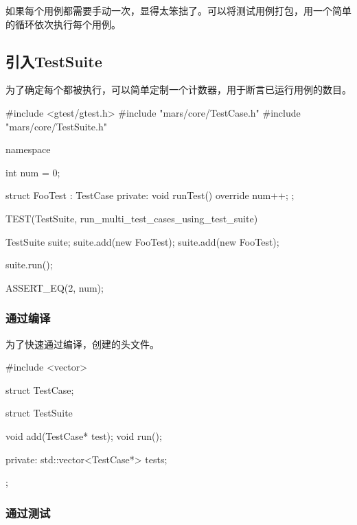 \begin{content}

如果每个用例都需要手动一次，显得太笨拙了。可以将测试用例打包，用一个简单的循环依次执行每个用例。

\subsection{引入TestSuite}

为了确定每个都被执行，可以简单定制一个计数器，用于断言已运行用例的数目。

\begin{leftbar}
 \begin{c++}[caption={\ttfamily{test/mars/core/TestSuiteSpec.cc}}]
#include <gtest/gtest.h>
#include "mars/core/TestCase.h"
#include "mars/core/TestSuite.h"

namespace {
  int num = 0;

  struct FooTest : TestCase {
  private:
    void runTest() override {
      num++;
    }
  };
}

TEST(TestSuite, run_multi_test_cases_using_test_suite) {
  TestSuite suite;
  suite.add(new FooTest);
  suite.add(new FooTest);

  suite.run();

  ASSERT_EQ(2, num);
}
 \end{c++}
\end{leftbar}

\subsubsection{通过编译}

为了快速通过编译，创建的头文件。

\begin{leftbar}
 \begin{c++}[caption={\ttfamily{include/mars/core/TestSuite.h}}]
#include <vector>

struct TestCase;

struct TestSuite {
  void add(TestCase* test);
  void run();

private:
  std::vector<TestCase*> tests;
};
 \end{c++}
\end{leftbar}

\subsubsection{通过测试}


\end{content}
